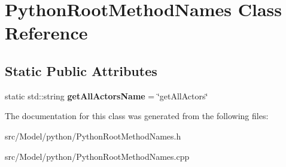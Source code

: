 \hypertarget{classPythonRootMethodNames}{}\section{Python\+Root\+Method\+Names Class Reference}
\label{classPythonRootMethodNames}
\subsection*{Static Public Attributes}
\begin{DoxyCompactItemize}
\item 
static std\+::string {\bfseries get\+All\+Actors\+Name} = \char`\"{}get\+All\+Actors\char`\"{}\hypertarget{classPythonRootMethodNames_a75acbb00924b748f0cfbb5daf4476635}{}\label{classPythonRootMethodNames_a75acbb00924b748f0cfbb5daf4476635}

\end{DoxyCompactItemize}


The documentation for this class was generated from the following files\+:\begin{DoxyCompactItemize}
\item 
src/\+Model/python/Python\+Root\+Method\+Names.\+h\item 
src/\+Model/python/Python\+Root\+Method\+Names.\+cpp\end{DoxyCompactItemize}
